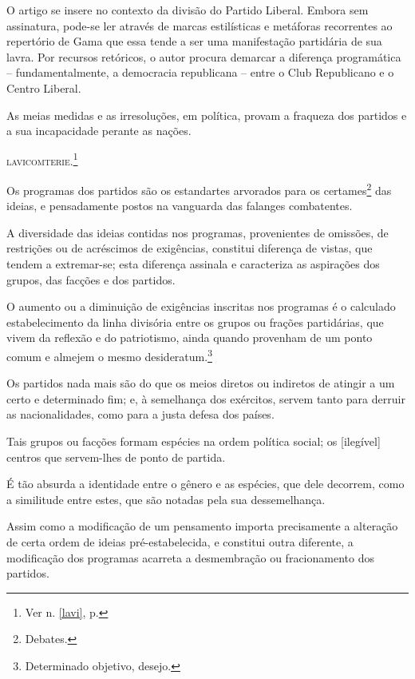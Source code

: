 \begin{didascalia}
O artigo se insere no contexto da divisão do Partido Liberal. Embora sem
assinatura, pode-se ler através de marcas estilísticas e metáforas
recorrentes ao repertório de Gama que essa tende a ser uma manifestação
partidária de sua lavra. Por recursos retóricos, o autor procura
demarcar a diferença programática -- fundamentalmente, a democracia
republicana -- entre o Club Republicano e o Centro Liberal.
\end{didascalia}



As meias medidas e as irresoluções, em política, provam a fraqueza dos
partidos e a sua incapacidade perante as nações.

\textsc{lavicomterie}.\footnote{Ver n. \ref{lavi}, p. \pageref{lavi}}

Os programas dos partidos são os estandartes arvorados para os
certames\footnote{Debates.} das ideias, e pensadamente postos na
vanguarda das falanges combatentes.

A diversidade das ideias contidas nos programas, provenientes de
omissões, de restrições ou de acréscimos de exigências, constitui
diferença de vistas, que tendem a extremar-se; esta diferença assinala e
caracteriza as aspirações dos grupos, das facções e dos partidos.

O aumento ou a diminuição de exigências inscritas nos programas é o
calculado estabelecimento da linha divisória entre os grupos ou frações
partidárias, que vivem da reflexão e do patriotismo, ainda quando
provenham de um ponto comum e almejem o mesmo desideratum.\footnote{
  Determinado objetivo, desejo.}

Os partidos nada mais são do que os meios diretos ou indiretos de
atingir a um certo e determinado fim; e, à semelhança dos exércitos,
servem tanto para derruir as nacionalidades, como para a justa defesa
dos países.

Tais grupos ou facções formam espécies na ordem política social; os
{[}ilegível{]} centros que servem-lhes de ponto de partida.

É tão absurda a identidade entre o gênero e as espécies, que dele
decorrem, como a similitude entre estes, que são notadas pela sua
dessemelhança.

Assim como a modificação de um pensamento importa precisamente a
alteração de certa ordem de ideias pré-estabelecida, e constitui outra
diferente, a modificação dos programas acarreta a desmembração ou
fracionamento dos partidos.


